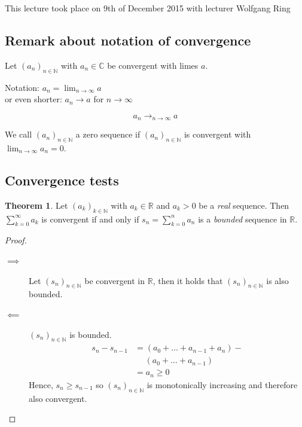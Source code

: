 \documentclass[a4paper,landscape,twocolumn]{article}
\theoremstyle{definition}
\newtheorem{theorem}{Theorem}
\newcommand\seq[1]{{\left(#1\right)}_{n \in \mathbb N}}
\newcommand\meta[3]{\begin{mdframed}[skipbelow=4pt,skipabove=4pt,innermargin=1pt,innerleftmargin=1pt,innerrightmargin=1pt]\begin{center}\small{\textdownarrow{} This #1 took place on #2 with lecturer #3}\end{center}\end{mdframed}}
\begin{document}
\meta{lecture}{9th of December 2015}{Wolfgang Ring}

\subsection{Remark about notation of convergence}

Let $\seq{a_n}$ with $a_n \in \mathbb C$ be convergent with limes $a$.

Notation: $a_n = \lim_{n\to\infty} a$ \\
or even shorter: $a_n \to a$ for $n \to \infty$

\[ a_n \to_{n\to\infty} a \]

We call $\seq{a_n}$ a zero sequence if $\seq{a_n}$ is convergent with $\lim_{n\to\infty} a_n = 0$.

\subsection{Convergence tests}
%
\begin{theorem}
  Let $\left(a_k\right)_{k\in\mathbb N}$ with $a_k \in \mathbb R$ and $a_k > 0$
  be a \emph{real} sequence. Then $\sum_{k=0}^\infty a_k$ is convergent if and only if
  $s_n = \sum_{k=0}^n a_n$ is a \emph{bounded} sequence in $\mathbb R$.
\end{theorem}
\begin{proof}
  \begin{description}
    \item[$\implies$]
      Let $\seq{s_n}$ be convergent in $\mathbb R$, then it holds that
      $\seq{s_n}$ is also bounded.
    \item[$\impliedby$]
      $\seq{s_n}$ is bounded.
      \begin{align*}
        s_n - s_{n-1} &= (a_0 + \ldots + a_{n-1} + a_n) - \\
                      &\hspace{15pt} (a_0 + \ldots + a_{n-1}) \\
                      &= a_n \geq 0
      \end{align*}
      Hence, $s_n \geq s_{n-1}$ so $\seq{s_n}$ is monotonically increasing and therefore also convergent.
  \end{description}
\end{proof}
\end{document}
